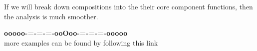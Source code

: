 \documentclass{ximera}
\begin{document}
If we will break down compositions into the their core component functions, then the analysis is much smoother.























\begin{center}
\textbf{\textcolor{green!50!black}{ooooo-=-=-=-ooOoo-=-=-=-ooooo}} \\

more examples can be found by following this link\\ 

\end{center}
\end{document}

